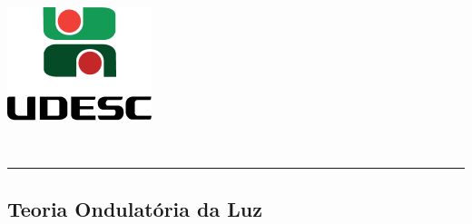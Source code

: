 \thispagestyle{empty}
\begin{center}
	\begin{minipage}[!]{\linewidth}
        \begin{minipage}[!]{.19\linewidth}
            \includegraphics[width=\linewidth]{img/logo.png}           
        \end{minipage}
        \begin{minipage}[!]{.8\linewidth}
            \center
            \ABNTEXchapterfont\normalsize\MakeUppercase{\imprimirinstituicao}
            \par
            \vspace*{10pt}                     
            \ABNTEXchapterfont\normalsize\MakeUppercase{\centro}
            \par
            \vspace*{10pt}           
            \ABNTEXchapterfont\normalsize\MakeUppercase{\disciplina}
        \end{minipage}        
    \end{minipage}
    \\ \vspace{0.5cm}
    \rule{\textwidth}{.5pt}   
\end{center}
    \textual
    \begin{center}
      \section{Teoria Ondulatória da Luz}
      \par
    \end{center}
    
